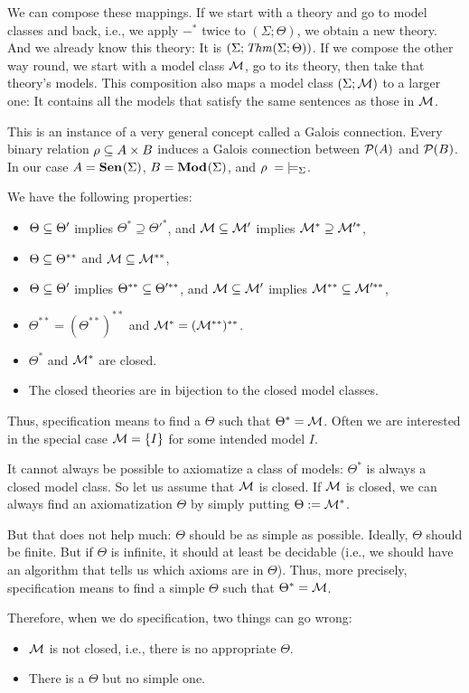 We can compose these mappings. If we start with a theory and go to model classes and back, i.e., we apply $-^*$ twice to $(\Sigma;\Theta)$, we obtain a new theory. And we already know this theory: It is $(\Sigma;\mathit{Thm}(\Sigma;\Theta))$. If we compose the other way round, we start with a model class ${\cal M}$, go to its theory, then take that theory's models. This composition also maps a model class $(\Sigma;{\cal M})$ to a larger one: It contains all the models that satisfy the same sentences as those in ${\cal M}$.

This is an instance of a very general concept called a Galois connection. Every binary relation $\rho\subseteq A\times B$ induces a Galois connection between $\mathcal{P}(A)$ and $\mathcal{P}(B)$. In our case $A={\mathbf{Sen}^{}}(\Sigma)$, $B={\mathbf{Mod}^{}}(\Sigma)$, and $\rho\;=\;\models_\Sigma$.

We have the following properties:
\begin{itemize}
\item $\Theta\subseteq\Theta'$ implies $\Theta^*\supseteq\Theta'^*$, and ${\cal M}\subseteq{\cal M}'$ implies ${\cal M}^*\supseteq{\cal M}'^*$,
\item $\Theta\subseteq\Theta^{**}$ and ${\cal M}\subseteq{\cal M}^{**}$,
\item $\Theta\subseteq\Theta'$ implies $\Theta^{**}\subseteq\Theta'^{**}$, and ${\cal M}\subseteq{\cal M}'$ implies ${\cal M}^{**}\subseteq{\cal M}'^{**}$,
\item $\Theta^{**}=(\Theta^{**})^{**}$ and ${\cal M}^*=({\cal M}^{**})^{**}$.
\item $\Theta^*$ and ${\cal M}^*$ are closed.
\item The closed theories are in bijection to the closed model classes.
\end{itemize}

Thus, specification means to find a $\Theta$ such that $\Theta^*={\cal M}$. Often we are interested in the special case ${\cal M}=\{I\}$ for some intended model $I$.

It cannot always be possible to axiomatize a class of models: $\Theta^*$ is always a closed model class. So let us assume that ${\cal M}$ is closed. If ${\cal M}$ is closed, we can always find an axiomatization $\Theta$ by simply putting $\Theta:={\cal M}^*$.

But that does not help much: $\Theta$ should be as simple as possible. Ideally, $\Theta$ should be finite. But if $\Theta$ is infinite, it should at least be decidable (i.e., we should have an algorithm that tells us which axioms are in $\Theta$). Thus, more precisely, specification means to find a simple $\Theta$ such that $\Theta^*={\cal M}$.

Therefore, when we do specification, two things can go wrong:
\begin{itemize}
 \item ${\cal M}$ is not closed, i.e., there is no appropriate $\Theta$.
 \item There is a $\Theta$ but no simple one.
\end{itemize}

